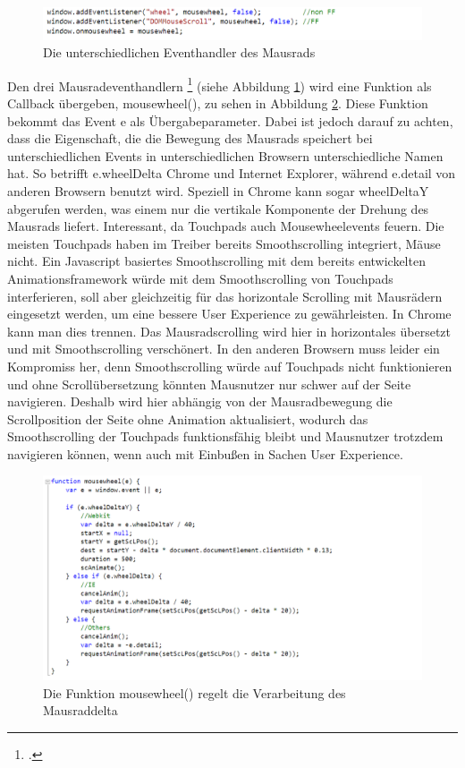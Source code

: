 \begin{figure} [h]
\includegraphics[width=\textwidth]{./img/js_mousehandler.png}
\caption{Die unterschiedlichen Eventhandler des Mausrads}
\label{js_mousehandler}
\end{figure}

Den drei Mausradeventhandlern  \footcite[vgl.][]{jsMousewheel} (siehe Abbildung \ref{js_mousehandler}) wird eine Funktion als Callback übergeben, mousewheel(), zu sehen in Abbildung \ref{js_mousewheel}. Diese Funktion bekommt das Event e als Übergabeparameter. Dabei ist jedoch darauf zu achten, dass die Eigenschaft, die die Bewegung des Mausrads speichert bei unterschiedlichen Events in unterschiedlichen Browsern unterschiedliche Namen hat. So betrifft e.wheelDelta Chrome und Internet Explorer, während e.detail von anderen Browsern benutzt wird. Speziell in Chrome kann sogar wheelDeltaY abgerufen werden, was einem nur die vertikale Komponente der Drehung des Mausrads liefert. Interessant, da Touchpads auch Mousewheelevents feuern. Die meisten Touchpads haben im Treiber bereits Smoothscrolling integriert, Mäuse nicht. Ein Javascript basiertes Smoothscrolling mit dem bereits entwickelten Animationsframework würde mit dem Smoothscrolling von Touchpads interferieren, soll aber gleichzeitig für das horizontale Scrolling mit Mausrädern eingesetzt werden, um eine bessere User Experience zu gewährleisten. In Chrome kann man dies trennen. Das Mausradscrolling wird hier in horizontales übersetzt und mit Smoothscrolling verschönert. In den anderen Browsern muss leider ein Kompromiss her, denn Smoothscrolling würde auf Touchpads nicht funktionieren und ohne Scrollübersetzung könnten Mausnutzer nur schwer auf der Seite navigieren. Deshalb wird hier abhängig von der Mausradbewegung die Scrollposition der Seite ohne Animation aktualisiert, wodurch das Smoothscrolling der Touchpads funktionsfähig bleibt und Mausnutzer trotzdem navigieren können, wenn auch mit Einbußen in Sachen User Experience.

\begin{figure} [h]
\includegraphics[width=\textwidth]{./img/js_mousewheel.png}
\caption{Die Funktion mousewheel() regelt die Verarbeitung des Mausraddelta}
\label{js_mousewheel}
\end{figure}


